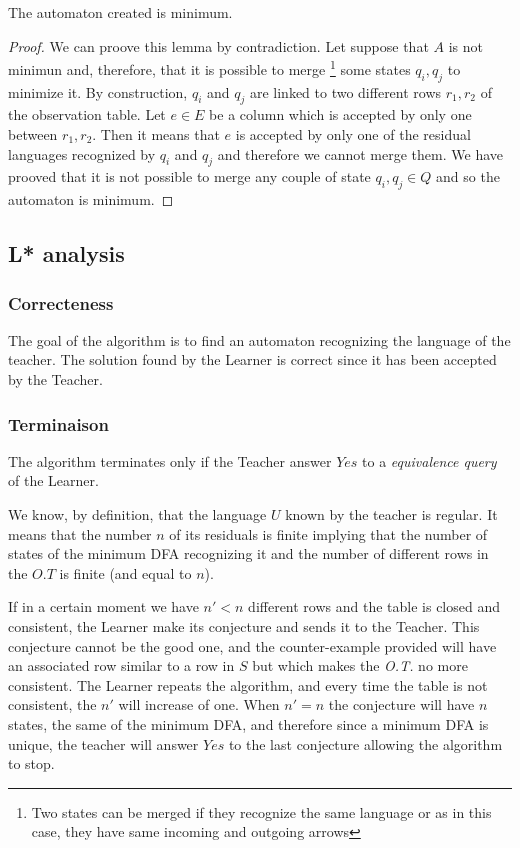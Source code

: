 \begin{lemma}
  The automaton created is minimum.
\end{lemma}

\begin{proof}
  We can proove this lemma by contradiction. Let suppose that $A$ is not minimun and, therefore, that it is possible to merge \footnote{Two states can be merged if they recognize the same language or as in this case, they have same incoming and outgoing arrows} some states $q_i, q_j$ to minimize it.
  By construction, $q_i$ and $q_j$ are linked to two different rows $r_1, r_2$ of the observation table.
  Let $e \in E$ be a column which is accepted by only one between $r_1, r_2$.
  Then it means that $e$ is accepted by only one of the residual languages recognized by $q_i$ and $q_j$ and therefore we cannot merge them.
  We have prooved that it is not possible to merge any couple of state $q_i, q_j \in Q$ and so the automaton is minimum.
\end{proof}

\subsection{L* analysis}
\subsubsection{Correcteness}
The goal of the algorithm is to find an automaton recognizing the language of the teacher. The solution found by the Learner is correct since it has been accepted by the Teacher.
\subsubsection{Terminaison}
The algorithm terminates only if the Teacher answer $Yes$ to a \textit{equivalence query} of the Learner.

We know, by definition, that the language $U$ known by the teacher is regular. It means that the number $n$ of its residuals is finite implying that the number of states of the minimum DFA recognizing it and the number of different rows in the $O.T$ is finite (and equal to $n$).

If in a certain moment we have $n' < n$ different rows and the table is closed and consistent, the Learner make its conjecture and sends it to the Teacher. This conjecture cannot be the good one, and the counter-example provided will have an associated row similar to a row in $S$ but which makes the \textit{O.T.} no more consistent. The Learner repeats the algorithm, and every time the table is not consistent, the $n'$ will increase of one. When $n' = n$ the conjecture will have $n$ states, the same of the minimum DFA, and therefore since a minimum DFA is unique, the teacher will answer $Yes$ to the last conjecture allowing the algorithm to stop.

